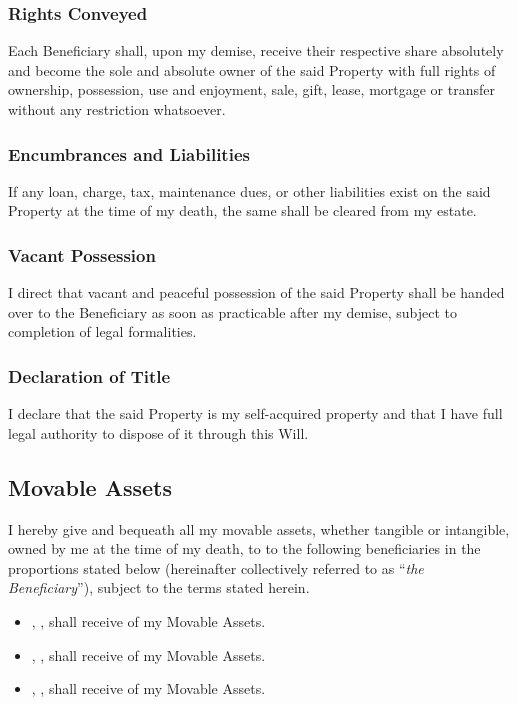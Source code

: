 \subsubsection*{Rights Conveyed}
Each Beneficiary shall, upon my demise, receive their respective share absolutely and become the sole and absolute owner of the said Property with full rights of ownership, possession, use and enjoyment, sale, gift, lease, mortgage or transfer without any restriction whatsoever.

\subsubsection*{Encumbrances and Liabilities}
If any loan, charge, tax, maintenance dues, or other liabilities exist on the said Property at the time of my death, the same shall be cleared from my estate. 

\subsubsection*{Vacant Possession}
I direct that vacant and peaceful possession of the said Property shall be handed over to the Beneficiary as soon as practicable after my demise, subject to completion of legal formalities.

\subsubsection*{Declaration of Title}
I declare that the said Property is my self-acquired property and that I have full legal authority to dispose of it through this Will.

\subsection{Movable Assets}
I hereby give and bequeath all my movable assets, whether tangible or intangible, owned by me at the time of my death, to to the following beneficiaries in the proportions stated below (hereinafter collectively referred to as “\textit{the Beneficiary}”), subject to the terms stated herein.

\begin{itemize}
  \item \FirstBeneficiaryName{}, \FirstBeneficiaryRelationship{}, shall receive \FirstBeneficiaryFraction{} of my Movable Assets.
  \item \SecondBeneficiaryName{}, \SecondBeneficiaryRelationship{}, shall receive \SecondBeneficiaryFraction{} of my Movable Assets.
  \item \ThirdBeneficiaryName{}, \ThirdBeneficiaryRelationship{}, shall receive \ThirdBeneficiaryFraction{} of my Movable Assets.
\end{itemize}

